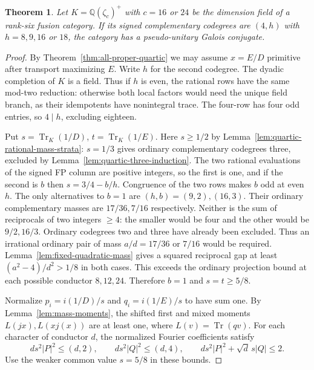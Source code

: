 \documentclass[11pt,reqno]{amsart}
\newtheorem{theorem}{Theorem}[section]
\theoremstyle{remark}\newtheorem{remark}[theorem]{Remark}
\numberwithin{equation}{section}
\begin{document}
\begin{theorem}\label{thm:quartic24-rational-nonhalf}
Let $K=\mathbb Q(\zeta_c)^+$ with $c=16$ or $24$ be the dimension
field of a rank-six fusion category. If its signed complementary
codegrees are $(4,h)$ with $h=8,9,16$ or $18$, the category has a
pseudo-unitary Galois conjugate.
\end{theorem}
\begin{proof}
By Theorem~\ref{thm:all-proper-quartic} we may assume
$x=E/D$ primitive after transport maximizing $E$. Write $h$ for
the second codegree. The dyadic completion of $K$ is a field.
Thus if $h$ is even, the rational rows have the same mod-two
reduction: otherwise both local factors would need the unique field
branch, as their idempotents have nonintegral trace. The four-row
has four odd entries, so $4\mid h$, excluding eighteen.

Put $s=\operatorname{Tr}_K(1/D)$, $t=\operatorname{Tr}_K(1/E)$.
Here $s\ge1/2$ by Lemma~\ref{lem:quartic-rational-mass-strata}:
$s=1/3$ gives ordinary
complementary codegrees three, excluded by
Lemma~\ref{lem:quartic-three-induction}.
The two rational evaluations of the signed FP column are positive
integers, so the first is one, and if the second is $b$ then
$s=3/4-b/h$. Congruence of the two rows makes $b$ odd at even $h$.
The only alternatives to $b=1$ are $(h,b)=(9,2),(16,3)$.
Their ordinary complementary masses are $17/36,7/16$ respectively.
Neither is the sum of reciprocals of two integers $\ge4$: the
smaller would be four and the other would be $9/2,16/3$.
Ordinary codegrees two and three have already been excluded. Thus an
irrational ordinary pair of mass $a/d=17/36$ or $7/16$ would be
required. Lemma~\ref{lem:fixed-quadratic-mass} gives a squared
reciprocal gap at least $(a^2-4)/d^2>1/8$ in both cases. This exceeds
the ordinary projection bound at each possible conductor $8,12,24$.
Therefore $b=1$ and $s=t\ge5/8$.

Normalize $p_i=i(1/D)/s$ and $q_i=i(1/E)/s$ to have sum one.
By Lemma~\ref{lem:mass-moments}, the shifted first and mixed moments
$L(jx),L(xj(x))$ are at least one, where $L(v)=\operatorname{Tr}(qv)$.
For each character of conductor $d$, the normalized Fourier
coefficients satisfy
\[
 d s^2|P|^2\le(d,2),\qquad d s^2|Q|^2\le(d,4),\qquad
 d s^2|P|^2+\sqrt d\,s|Q|\le2.
\]
Use the weaker common value $s=5/8$ in these bounds.


\end{proof}
\end{document}
